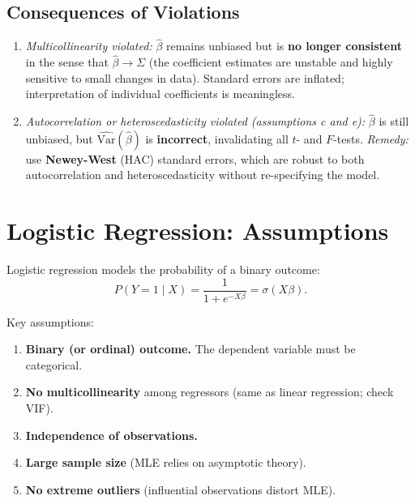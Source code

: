 \documentclass[11pt, a4paper]{article}
\begin{document}
\subsection{Consequences of Violations}

\begin{enumerate}[label=\textbf{(\alph*)}]

\item \textit{Multicollinearity violated:}
$\hat\beta$ remains unbiased but is \textbf{no longer consistent} in the sense that $\hat\beta \to \Sigma$ (the coefficient estimates are unstable and highly sensitive to small changes in data). Standard errors are inflated; interpretation of individual coefficients is meaningless.

\item \textit{Autocorrelation or heteroscedasticity violated (assumptions c and e):}
$\hat\beta$ is still unbiased, but $\widehat{\mathrm{Var}}(\hat\beta)$ is \textbf{incorrect}, invalidating all $t$- and $F$-tests.
\textit{Remedy:} use \textbf{Newey-West} (HAC) standard errors, which are robust to both autocorrelation and heteroscedasticity without re-specifying the model.

\end{enumerate}

\section{Logistic Regression: Assumptions}

Logistic regression models the probability of a binary outcome:
\[
  P(Y=1 \mid X) = \frac{1}{1 + e^{-X\beta}} = \sigma(X\beta).
\]

Key assumptions:
\begin{enumerate}[label=\textbf{(\alph*)}]
\item \textbf{Binary (or ordinal) outcome.} The dependent variable must be categorical.
\item \textbf{No multicollinearity} among regressors (same as linear regression; check VIF).
\item \textbf{Independence of observations.}
\item \textbf{Large sample size} (MLE relies on asymptotic theory).
\item \textbf{No extreme outliers} (influential observations distort MLE).
\end{enumerate}
\end{document}

